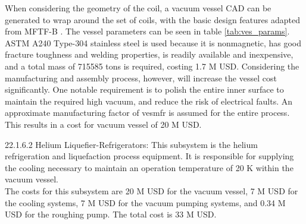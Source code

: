 When considering the geometry of the coil, a vacuum vessel CAD can be generated to wrap around the set of coils, with the basic design features adapted from MFTF-B \cite{gerich1986design}. The vessel parameters can be seen in table \ref{tab:ves_params}. ASTM A240 Type-304 stainless steel is used because it is nonmagnetic, has good fracture toughness and welding properties, is readily available and inexpensive, and a total mass of 715585 tons is required, costing 1.7 M USD. Considering the manufacturing and assembly process, however, will increase the vessel cost significantly. One notable requirement is to polish the entire inner surface to maintain the required high vacuum, and reduce the risk of electrical faults. An approximate manufacturing factor of vesmfr is assumed for the entire process. This results in a cost for vacuum vessel of 20 M USD.


\begin{table}[h]
    \centering
    \caption{Vacuum vessel parameters.}
    \label{tab:ves_params}
\end{table}



22.1.6.2 Helium Liquefier-Refrigerators: This subsystem is the helium refrigeration and liquefaction process equipment. It is responsible for supplying the cooling necessary to maintain an operation temperature of 20 K within the vacuum vessel. \\

The costs for this subsystem are 20 M USD for the vacuum vessel, 7 M USD for the cooling systems, 7 M USD for the vacuum pumping systems, and 0.34 M USD for the roughing pump. The total cost is 33 M USD.\\

